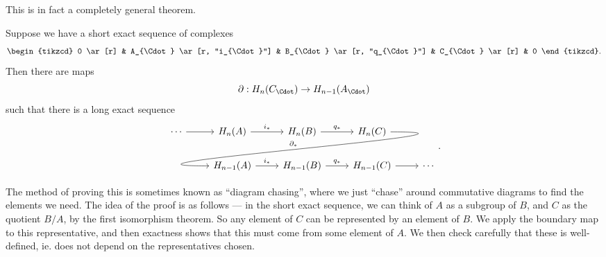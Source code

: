 \documentclass[a4paper]{article}
\begin{document}
This is in fact a completely general theorem.
\begin{thm}
  Suppose we have a short exact sequence of complexes
  \[
    \begin{tikzcd}
      0 \ar[r] & A_{\Cdot} \ar [r, "i_{\Cdot}"] & B_{\Cdot} \ar [r, "q_{\Cdot}"] & C_{\Cdot} \ar[r] & 0
    \end{tikzcd}.
  \]
  Then there are maps
  \[
    \partial: H_n(C_{\Cdot}) \to H_{n - 1}(A_{\Cdot})
  \]
  such that there is a long exact sequence
  \[
    \begin{tikzcd}
      \cdots \ar [r] & H_n(A) \ar[r, "i_*"] & H_n(B) \ar[r, "q_*"] & H_n(C) \ar[out=0, in=180, looseness=2, overlay, dll, "\partial_*"']\\
      & H_{n - 1}(A) \ar[r, "i_*"] & H_{n - 1}(B) \ar[r, "q_*"] & H_{n - 1}(C) \ar [r] & \cdots
    \end{tikzcd}.
  \]
\end{thm}
The method of proving this is sometimes known as ``diagram chasing'', where we just ``chase'' around commutative diagrams to find the elements we need. The idea of the proof is as follows --- in the short exact sequence, we can think of $A$ as a subgroup of $B$, and $C$ as the quotient $B/A$, by the first isomorphism theorem. So any element of $C$ can be represented by an element of $B$. We apply the boundary map to this representative, and then exactness shows that this must come from some element of $A$. We then check carefully that these is well-defined, ie. does not depend on the representatives chosen.
\end{document}
